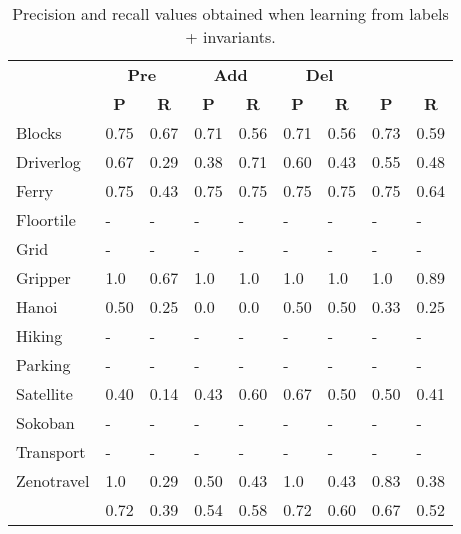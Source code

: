 \documentclass{article}
\begin{document}
\begin{table}[hbt!]
	\begin{scriptsize}
		\begin{center}
			\begin{tabular}{l|l|l|l|l|l|l||l|l|}
				& \multicolumn{2}{|c|}{\bf Pre} & \multicolumn{2}{|c|}{\bf Add} & \multicolumn{2}{|c||}{\bf Del} & \multicolumn{2}{|c}{\bf}\\ \cline{2-9}			
				& \multicolumn{1}{|c|}{\bf P} & \multicolumn{1}{|c|}{\bf R} & \multicolumn{1}{|c|}{\bf P} & \multicolumn{1}{|c|}{\bf R} & \multicolumn{1}{|c|}{\bf P} & \multicolumn{1}{|c||}{\bf R} &  \multicolumn{1}{|c|}{\bf P} & \multicolumn{1}{|c|}{\bf R} \\
				\hline
				Blocks & 0.75 & 0.67 & 0.71 & 0.56 & 0.71 & 0.56 & 0.73 & 0.59 \\
				Driverlog & 0.67 & 0.29 & 0.38 & 0.71 & 0.60 & 0.43 & 0.55 & 0.48 \\
				Ferry & 0.75 & 0.43 & 0.75 & 0.75 & 0.75 & 0.75 & 0.75 & 0.64 \\
				Floortile & - & - & - & - & - & - & - & - \\ %
				Grid & - & - & - & - & - & - & - & - \\ %
				Gripper & 1.0 & 0.67 & 1.0 & 1.0 & 1.0 & 1.0 & 1.0 & 0.89 \\
				Hanoi & 0.50 & 0.25 & 0.0 & 0.0 & 0.50 & 0.50 & 0.33 & 0.25 \\
				Hiking & - & - & - & - & - & - & - & - \\ %
				Parking & - & - & - & - & - & - & - & - \\ %
				Satellite & 0.40 & 0.14 & 0.43 & 0.60 & 0.67 & 0.50 & 0.50 & 0.41 \\
				Sokoban & - & - & - & - & - & - & - & - \\ %
				Transport & - & - & - & - & - & - & - & - \\ %
				Zenotravel & 1.0 & 0.29 & 0.50 & 0.43 & 1.0 & 0.43 & 0.83 & 0.38 \\
				\hline
				\bf  & 0.72 & 0.39 & 0.54 & 0.58 & 0.72 & 0.60 & 0.67 & 0.52 \\
			\end{tabular}
		\end{center}
	\end{scriptsize}
 \caption{\small Precision and recall values obtained when learning from labels + invariants.}
\label{fig:invariants}
\end{table}
\end{document}
